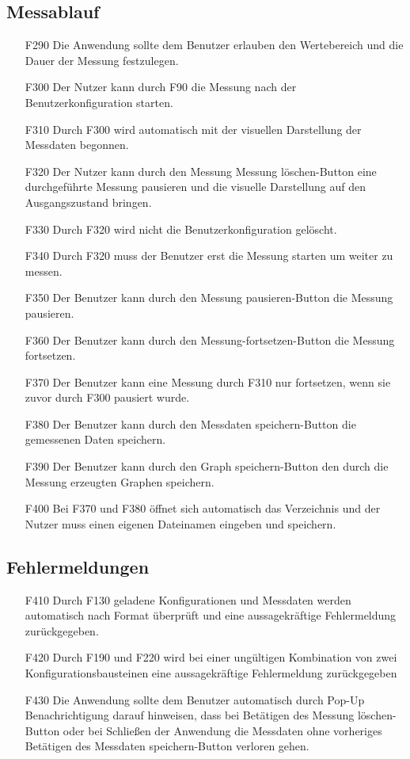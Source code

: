 \documentclass[parskip=full]{scrartcl}
\begin{document}
\subsection{Messablauf}

\begin{itemize}

\item[F290] Die Anwendung sollte dem Benutzer erlauben den Wertebereich und die Dauer der Messung festzulegen.
\item[F300] Der Nutzer kann durch F90 die Messung nach der Benutzerkonfiguration starten.
\item[F310] Durch F300 wird automatisch mit der visuellen Darstellung der Messdaten begonnen.
\item[F320] Der Nutzer kann durch den Messung Messung löschen-Button eine durchgeführte Messung pausieren und die visuelle Darstellung auf den Ausgangszustand bringen.
\item[F330] Durch F320 wird nicht die Benutzerkonfiguration gelöscht.
\item[F340] Durch F320 muss der Benutzer erst die Messung starten um weiter zu messen.
\item[F350] Der Benutzer kann durch den Messung pausieren-Button die Messung pausieren.
\item[F360] Der Benutzer kann durch den Messung-fortsetzen-Button die Messung fortsetzen.
\item[F370] Der Benutzer kann eine Messung durch F310 nur fortsetzen, wenn sie zuvor durch F300 pausiert wurde.
\item[F380] Der Benutzer kann durch den Messdaten speichern-Button die gemessenen Daten speichern.
\item[F390] Der Benutzer kann durch den Graph speichern-Button den durch die Messung erzeugten Graphen speichern.
\item[F400] Bei F370 und F380 öffnet sich automatisch das Verzeichnis und der Nutzer muss einen eigenen Dateinamen eingeben und speichern. 

\end{itemize}

\subsection{Fehlermeldungen}

\begin{itemize}
\item[F410] Durch F130 geladene Konfigurationen und Messdaten werden automatisch nach Format überprüft und eine aussagekräftige Fehlermeldung zurückgegeben.
\item[F420] Durch F190 und F220 wird bei einer ungültigen Kombination von zwei Konfigurationsbausteinen eine aussagekräftige Fehlermeldung zurückgegeben
\item[F430] Die Anwendung sollte dem Benutzer automatisch durch Pop-Up Benachrichtigung darauf hinweisen, dass bei Betätigen des Messung löschen-Button oder bei Schließen der Anwendung die Messdaten ohne vorheriges Betätigen des Messdaten speichern-Button verloren gehen.

\end{itemize}
\end{document}
